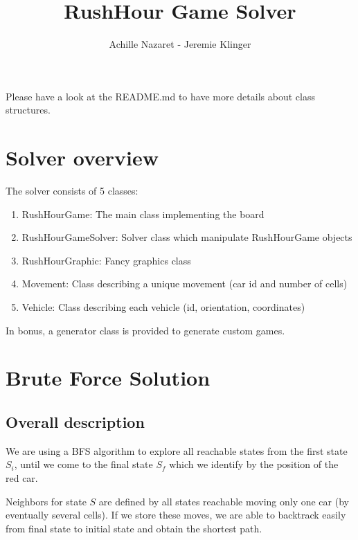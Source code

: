 \documentclass[10pt,a4paper]{article}
\author{Achille Nazaret - Jeremie Klinger}
\title{RushHour Game Solver}
\begin{document}
\maketitle

Please have a look at the README.md to have more details about class structures.

\section{Solver overview}



The solver consists of 5 classes:
\begin{enumerate}
\item RushHourGame: The main class implementing the board
\item RushHourGameSolver: Solver class which manipulate RushHourGame objects
\item RushHourGraphic: Fancy graphics class
\item Movement: Class describing a unique movement (car id and number of cells)
\item Vehicle: Class describing each vehicle (id, orientation, coordinates)
\end{enumerate}

In bonus, a generator class is provided to generate custom games.

\section{Brute Force Solution}
\subsection{Overall description}
We are using a BFS algorithm to explore all reachable states from the first state $S_i$, until we come to the final state $S_f$ which we identify by the position of the red car.

Neighbors for state $S$ are defined by all states reachable moving only one car (by eventually several cells). If we store these moves, we are able to backtrack easily from final state to initial state and obtain the shortest path.
\end{document}
